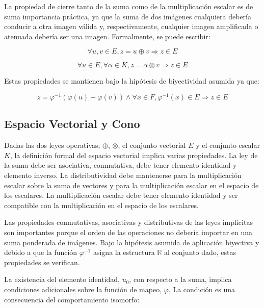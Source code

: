 La propiedad de cierre tanto de la suma como de la multiplicación escalar es de suma importancia práctica, ya que la suma de dos imágenes cualquiera debería conducir a otra imagen válida y, respectivamente, cualquier imagen amplificada o atenuada debería ser una imagen. Formalmente, se puede escribir:

\begin{equation}
	\forall u,v \in E, z = u \oplus v \Rightarrow z \in E
\end{equation}

\begin{equation}
	\forall u \in E, \forall \alpha \in K, z=\alpha \otimes v \Rightarrow z \in E
\end{equation}

Estas propiedades se mantienen bajo la hipótesis de biyectividad asumida ya que: 

\begin{equation}
	z=\varphi^{-1}(\varphi(u)+\varphi(v)) \land \forall x \in F, \varphi^{-1}(x) \in E \Rightarrow z \in E
\end{equation}

\subsection{Espacio Vectorial y Cono}
Dadas las dos leyes operativas, $\oplus$, $\otimes$, el conjunto vectorial $E$ y el conjunto escalar $K$, la definición formal del espacio vectorial implica varias propiedades. La ley de la suma debe ser asociativa, conmutativa, debe tener elemento identidad y elemento inverso. La distributividad debe mantenerse para la multiplicación escalar sobre la suma de vectores y para la multiplicación escalar en el espacio de los escalares. La multiplicación escalar debe tener elemento identidad y ser compatible con la multiplicación en el espacio de los escalares.

Las propiedades conmutativas, asociativas y distributivas de las leyes implícitas son importantes porque el orden de las operaciones no debería importar en una suma ponderada de imágenes. Bajo la hipótesis asumida de aplicación biyectiva y debido a que la función $\varphi^{-1}$ asigna la estructura $\mathbb{R}$ al conjunto dado, estas propiedades se verifican.

La existencia del elemento identidad, $u_0$, con respecto a la suma, implica condiciones adicionales sobre la función de mapeo, $\varphi$. La condición es una consecuencia del comportamiento isomorfo:


